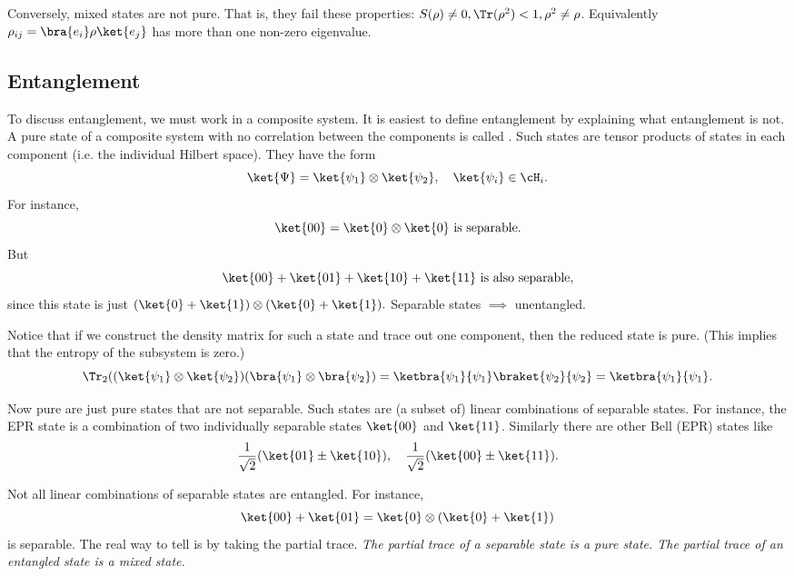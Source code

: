 Conversely, mixed states are not pure. That is, they fail these properties: $S(\rho)\neq 0, \Tr(\rho^2) <1, \rho^2 \neq \rho$. Equivalently $\rho_{ij}=\bra{e_i}\rho \ket{e_j}$ has more than one non-zero eigenvalue.

\subsection*{Entanglement}
To discuss entanglement, we must work in a composite system. It is easiest to define entanglement by explaining what entanglement is not. A pure state of a composite system with no correlation between the components is called . Such states are tensor products of states in each component (i.e. the individual Hilbert space). They have the form
\begin{equation}
    \ket{\Psi} = \ket{\psi_1} \otimes \ket{\psi_2},\quad \ket{\psi_i} \in \cH_i.
\end{equation}
For instance,
\begin{equation}
    \ket{00} = \ket{0} \otimes \ket{0} \text{ is separable}.
\end{equation}
But
\begin{equation}
    \ket{00} + \ket{01} + \ket{10} +\ket{11} \text{ is also separable},
\end{equation}
since this state is just $(\ket{0}+\ket{1})\otimes (\ket{0}+\ket{1}).$
Separable states $\implies$ unentangled.

Notice that if we construct the density matrix for such a state and trace out one component, then the reduced state is pure. (This implies that the entropy of the subsystem is zero.)
\begin{equation}
    \Tr_2((\ket{\psi_1}\otimes \ket{\psi_2})(\bra{\psi_1}\otimes \bra{\psi_2}) = \ketbra{\psi_1}{\psi_1} \braket{\psi_2}{\psi_2} = \ketbra{\psi_1}{\psi_1}.
\end{equation}

Now pure  are just pure states that are not separable. Such states are (a subset of) linear combinations of separable states. For instance, the EPR state is a combination of two individually separable states $\ket{00}$ and $\ket{11}$. Similarly there are other Bell (EPR) states like
\begin{equation}
    \frac{1}{\sqrt{2}}(\ket{01} \pm \ket{10}),\quad \frac{1}{\sqrt{2}}(\ket{00} \pm \ket{11}).
\end{equation}

Not all linear combinations of separable states are entangled. For instance,
\begin{equation}
    \ket{00} + \ket{01} = \ket{0} \otimes (\ket{0} + \ket{1})
\end{equation}
is separable. The real way to tell is by taking the partial trace. \emph{The partial trace of a separable state is a pure state. The partial trace of an entangled state is a mixed state.}

